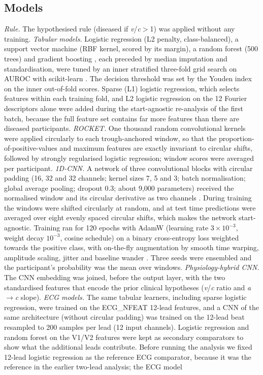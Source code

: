 \documentclass[11pt]{article}
\begin{document}
\subsection*{Models}
\textit{Rule.} The hypothesised rule (diseased if \textit{v}/\textit{c}$>$1) was applied without any training. \textit{Tabular models.} Logistic regression (L2 penalty, class-balanced), a support vector machine (RBF kernel, scored by its margin), a random forest (500 trees) \cite{breiman2001random} and gradient boosting \cite{friedman2001greedy}, each preceded by median imputation and standardisation, were tuned by an inner stratified three-fold grid search on AUROC \cite{cawley2010overfitting,vabalas2019machine} with scikit-learn \cite{pedregosa2011scikit}. The decision threshold was set by the Youden index on the inner out-of-fold scores. Sparse (L1) logistic regression, which selects features within each training fold, and L2 logistic regression on the 12 Fourier descriptors alone were added during the start-agnostic re-analysis of the first batch, because the full feature set contains far more features than there are diseased participants. \textit{ROCKET.} One thousand random convolutional kernels \cite{dempster2020rocket} were applied circularly to each trough-anchored window, so that the proportion-of-positive-values and maximum features are exactly invariant to circular shifts, followed by strongly regularised logistic regression; window scores were averaged per participant. \textit{1D-CNN.} A network of three convolutional blocks with circular padding (16, 32 and 32 channels; kernel sizes 7, 5 and 3; batch normalisation; global average pooling; dropout 0.3; about 9,000 parameters) received the normalised window and its circular derivative as two channels \cite{kiranyaz2021onedimensional,ismailfawaz2019deep}. During training the windows were shifted circularly at random, and at test time predictions were averaged over eight evenly spaced circular shifts, which makes the network start-agnostic. Training ran for 120 epochs with AdamW \cite{loshchilov2019decoupled} (learning rate $3\times10^{-3}$, weight decay $10^{-3}$, cosine schedule) on a binary cross-entropy loss weighted towards the positive class, with on-the-fly augmentation by smooth time warping, amplitude scaling, jitter and baseline wander \cite{um2017data,iwana2021empirical}. Three seeds were ensembled and the participant's probability was the mean over windows. \textit{Physiology-hybrid CNN.} The CNN embedding was joined, before the output layer, with the two standardised features that encode the prior clinical hypotheses (\textit{v}/\textit{c} ratio and \textit{a}$\to$\textit{c} slope). \textit{ECG models.} The same tabular learners, including sparse logistic regression, were trained on the {{ECG_NFEAT}} 12-lead features, and a CNN of the same architecture (without circular padding) was trained on the 12-lead beat resampled to 200 samples per lead (12 input channels). Logistic regression and random forest on the V1/V2 features were kept as secondary comparators to show what the additional leads contribute. Before running the analysis we fixed 12-lead logistic regression as the reference ECG comparator, because it was the reference in the earlier two-lead analysis; the ECG model 
\end{document}
